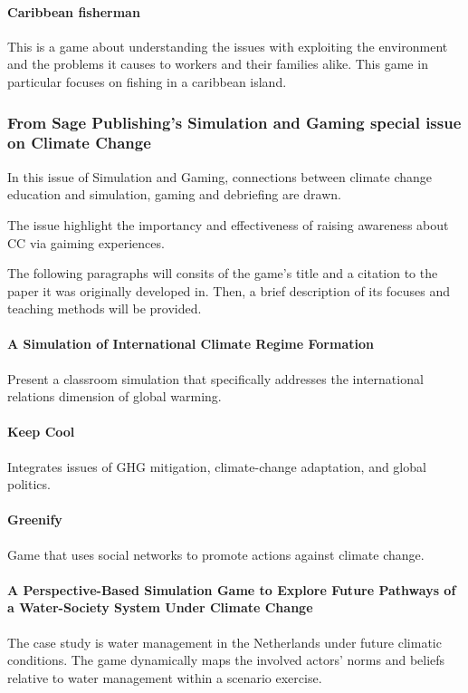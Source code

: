 \paragraph{Caribbean fisherman}
This is a game about understanding the issues with exploiting the environment
and the problems it causes to workers and their families alike. This game
in particular focuses on fishing in a caribbean island.

\subsubsection{From Sage Publishing's Simulation and Gaming special
issue on Climate Change}

In this issue of Simulation and Gaming, connections between climate change
education and simulation, gaming and debriefing are drawn.

The issue highlight the importancy and effectiveness of raising awareness
about \gls{CC} via gaiming experiences.

The following paragraphs will consits of the game's title and a citation
to the paper it was originally developed in. Then, a brief description
of its focuses and teaching methods will be provided.

\paragraph{A Simulation of International Climate Regime Formation
\cite{Kauneckis2013}}
Present a classroom simulation that specifically addresses the
international relations dimension of global warming.

\paragraph{Keep Cool
\cite{Eisenack2013}}
Integrates issues of \gls{GHG} mitigation, climate-change adaptation, and global politics.

\paragraph{Greenify 
\cite{Lee2013}}
Game that uses social networks to promote actions against climate change.

\paragraph{A Perspective-Based Simulation Game to Explore Future Pathways of a Water-Society System Under Climate Change
\cite{Valkering2013}}
The case study is water management in
the Netherlands under future climatic conditions. The game dynamically maps the
involved actors’ norms and beliefs relative to water management within a scenario
exercise.

